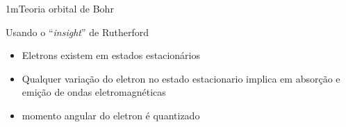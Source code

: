 \begin{sectionBox}1m{Teoria orbital de Bohr}

    Usando o ``\textit{insight}'' de Rutherford

    \begin{itemize}
        \item Eletrons existem em estados estacionários
        \item Qualquer variação do eletron no estado estacionario implica em absorção e emição de ondas eletromagnéticas
        \item momento angular do eletron é quantizado
    \end{itemize}




\end{sectionBox}


